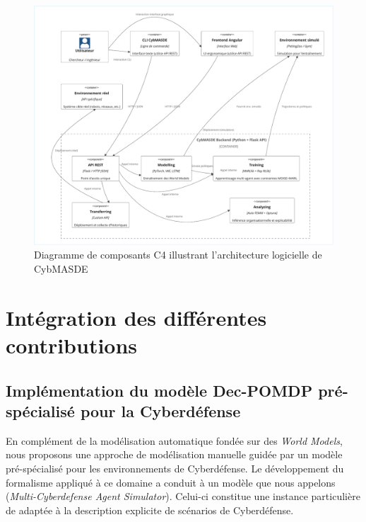 \begin{figure}[H]
  \centering
  \includegraphics[width=\textwidth]{figures/CybMASDE_internal_component_diagram.pdf}
  \caption{Diagramme de composants C4 illustrant l'architecture logicielle de CybMASDE}
  \label{fig:cybmasde_uml}
\end{figure}

\section{Intégration des différentes contributions}

\subsection{Implémentation du modèle Dec-POMDP pré-spécialisé pour la Cyberdéfense}

En complément de la modélisation automatique fondée sur des \textit{World Models}, nous proposons une approche de modélisation manuelle guidée par un modèle pré-spécialisé pour les environnements de Cyberdéfense.
Le développement du formalisme  appliqué à ce domaine a conduit à un modèle que nous appelons  (\textit{Multi-Cyberdefense Agent Simulator}). Celui-ci constitue une instance particulière de  adaptée à la description explicite de scénarios de Cyberdéfense.

